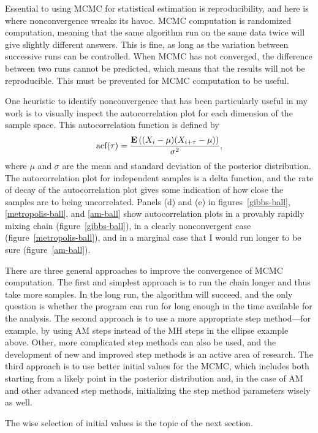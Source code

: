 Essential to using MCMC for statistical estimation is reproducibility,
and here is where nonconvergence wreaks its havoc.  MCMC computation
is randomized computation, meaning that the same algorithm run on the same
data twice will give slightly different answers.  This is fine, as
long as the variation between successive runs can be controlled.  When
MCMC has not converged, the difference between two runs cannot be
predicted, which means that the results will not be reproducible.  This
must be prevented for MCMC computation to be useful.

One heuristic to identify nonconvergence that has been particularly
useful in my work is to visually inspect the autocorrelation plot for
each dimension of the sample space.  This autocorrelation function is defined by
\[
\text{acf}(\tau) = \frac{\mathbf{E}\left((X_i - \mu)(X_{i+\tau} - \mu)\right)}{\sigma^2},
\]
where $\mu$ and $\sigma$ are the mean and standard deviation of the
posterior distribution.  The autocorrelation plot for independent
samples is a delta function, and the rate of decay of the
autocorrelation plot gives some indication of how close the samples
are to being uncorrelated.  Panels (d) and (e) in
figures~\ref{gibbs-ball}, \ref{metropolis-ball}, and \ref{am-ball}
show autocorrelation plots in a provably rapidly mixing chain
(figure~\ref{gibbs-ball}), in a clearly nonconvergent case
(figure~\ref{metropolis-ball}), and in a marginal case that I would
run longer to be sure (figure~\ref{am-ball}).

There are three general approaches to improve the convergence of MCMC
computation. The first and simplest approach is to run the chain
longer and thus take more samples.  In the long run, the algorithm
will succeed, and the only question is whether the program can run for long
enough in the time available for the analysis. The second approach is
to use a more appropriate step method---for example, by using AM steps
instead of the MH steps in the ellipse example above.  Other, more
complicated step methods can also be used, and the development of new
and improved step methods is an active area of research.  The third
approach is to use better initial values for the MCMC, which includes
both starting from a likely point in the posterior distribution and,
in the case of AM and other advanced step methods, initializing the
step method parameters wisely as well.

The wise selection of initial values is the topic of the next section.

